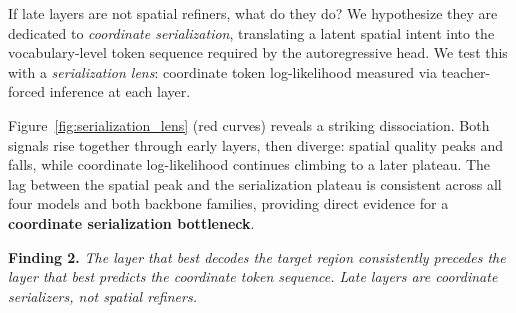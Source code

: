 If late layers are not spatial refiners, what do they do?
We hypothesize they are dedicated to \emph{coordinate serialization}, translating a latent spatial intent into the vocabulary-level token sequence required by the autoregressive head.
We test this with a \emph{serialization lens}: coordinate token log-likelihood measured via teacher-forced inference at each layer.

Figure~\ref{fig:serialization_lens} (red curves) reveals a striking dissociation.
Both signals rise together through early layers, then diverge: spatial quality peaks and falls, while coordinate log-likelihood continues climbing to a later plateau.
The lag between the spatial peak and the serialization plateau is consistent across all four models and both backbone families, providing direct evidence for a \textbf{coordinate serialization bottleneck}.


\begin{tcolorbox}[colback=gray!8, colframe=gray!40, boxrule=0.4pt, arc=2pt, left=4pt, right=4pt, top=3pt, bottom=3pt]
\textbf{Finding 2.}
\emph{The layer that best decodes the target region consistently precedes the layer that best predicts the coordinate token sequence. Late layers are coordinate serializers, not spatial refiners.}
\end{tcolorbox}

